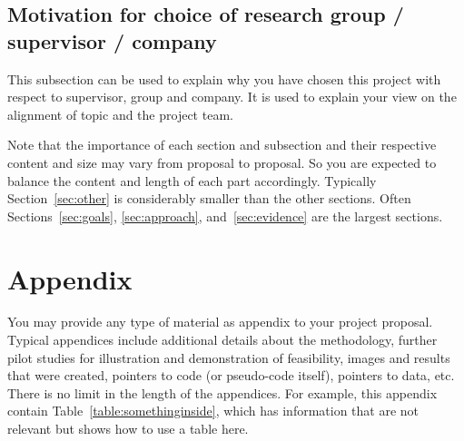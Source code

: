 \documentclass{article}
\begin{document}
\subsection{Motivation for choice of research group / supervisor / company}

This subsection can be used to explain why you have chosen this project with respect to supervisor, group and company. It is used to explain your view on the alignment of topic and the project team. 

Note that the importance of each section and subsection and their respective content and size may vary from proposal to proposal. So you are expected to balance the content and length of each part accordingly. Typically Section~\ref{sec:other} is considerably smaller than the other sections. Often Sections~\ref{sec:goals}, \ref{sec:approach}, and~\ref{sec:evidence} are the largest sections.

  


\appendix
\section{Appendix}

You may provide any type of material as appendix to your project proposal. Typical appendices include additional details about the methodology, further pilot studies for illustration and demonstration of feasibility, images and results that were created, pointers to code (or pseudo-code itself), pointers to data, etc. There is no limit in the length of the appendices. For example, this appendix contain Table~\ref{table:somethinginside}, which has information that are not relevant but shows how to use a table here.
\end{document}
